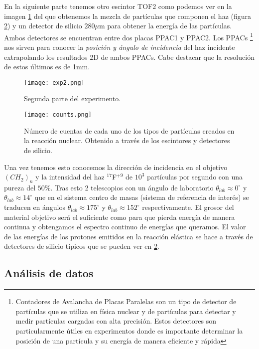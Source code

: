 \documentclass[fleqn,11pt]{SelfArx} %
\begin{document}
En la siguiente parte tenemos otro escintor TOF2 como podemos ver en la imagen \ref{Fig:08} del que obtenemos la mezcla de partículas que componen el haz (figura \ref{Fig:09}) y un detector de silicio $280\mu$m para obtener la energía de las partículas. Ambos detectores se encuentran entre dos placas PPAC1 y PPAC2. Los PPACs \footnote{Contadores de Avalancha de Placas Paralelas son un tipo de detector de partículas que se utiliza en física nuclear y de partículas para detectar y medir partículas cargadas con alta precisión. Estos detectores son particularmente útiles en experimentos donde es importante determinar la posición de una partícula y su energía de manera eficiente y rápida} nos sirven para conocer la \textit{posición y ángulo de incidencia} del haz incidente extrapolando los resultados 2D de ambos PPACs. Cabe destacar que la resolución de estos últimos es de 1mm.


\begin{figure}[h!] \centering
	\texttt{[image: exp2.png]}
	\caption{Segunda parte del experimento.}	
	\label{Fig:08}
\end{figure}

\begin{figure}[h!] \centering
	\texttt{[image: counts.png]}
	\caption{Número de cuentas de cada uno de los tipos de partículas creados en la reacción nuclear. Obtenido a través de los escintores y detectores de silicio.}
	\label{Fig:09}
\end{figure}

Una vez tenemos esto conocemos la dirección de incidencia en el objetivo $(CH_2)_n$ y la intensidad del haz $^{17}$F$^{+9}$ de $10^3$ partículas por segundo con una pureza del $50\%$. Tras esto 2 telescopios con un ángulo de laboratorio $\theta_{lab}\approx 0^\circ$ y $\theta_{lab}\approx 14^\circ$ que en el sistema centro de masas (sistema de referencia de interés) se traducen en ángulos  $\theta_{lab}\approx 175^\circ$ y $\theta_{lab}\approx 152^\circ$ respectivamente. El grosor del material objetivo será el suficiente como para que pierda energía de manera continua y obtengamos el espectro continuo de energías que queramos.
El valor de las energías de los protones emitidos en la reacción elástica se hace a través de detectores de silicio típicos que se pueden ver en \ref{Fig:09}.

\subsection{Análisis de datos}
\end{document}
